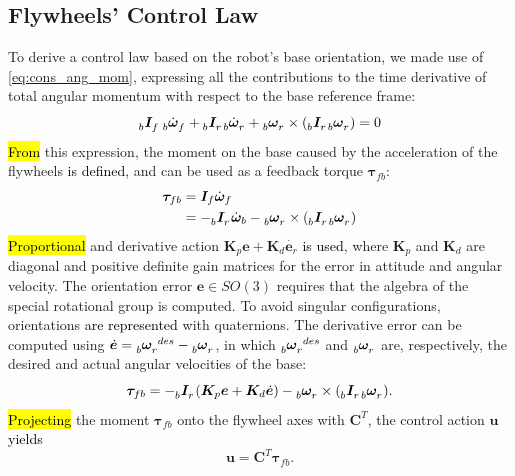 \documentclass[sensors,article,accept,pdftex,moreauthors]{Definitions/mdpi}
\newcommand{\MF}[1]{\textcolor{black}{#1}}
\begin{document}
\subsection{Flywheels' Control Law}
\label{subsec:control_law}
To derive a control law based on the robot's base orientation, we made use of \eqref{eq:cons_ang_mom}, expressing all the contributions to the time derivative of total angular momentum with respect to the base reference frame:
\begin{equation}
\tensor[_b]{\bm{I}}{_f} \, \tensor[_b]{\dot{\bm{\omega}}}{_f} + \tensor[_b]{\bm{I}}{_r} \tensor[_b]{\dot{\bm{\omega}}}{_r} + \tensor[_b]{\bm{\omega}}{_r} \times \left( \tensor[_b]{\bm{I}}{_r} \tensor[_b]{\bm{\omega}}{_r}\right) = 0
\end{equation}
\hl{From} this expression, the moment on the base caused by the acceleration of the flywheels \MF{is defined}, and can be used as a feedback torque $\bm{\tau}_{fb}$:
\begin{equation}
\begin{split}
\bm{\tau}_{fb} &= \bm{I}_f \dot{\bm{\omega}}_f \\
&= - \tensor[_b]{\bm{I}}{_r} \dot{\bm{\omega}}_b - \tensor[_b]{\bm{\omega}}{_r} \times \left( \tensor[_b]{\bm{I}}{_r} \tensor[_b]{\bm{\omega}}{_r}\right)
\end{split}
\end{equation}
\hl{Proportional} and derivative action $\bm{K}_p \bm{e} + \bm{K}_d \dot{\bm{e}_r}$ \MF{is used}, where $\bm{K}_p$ and $\bm{K}_d$ are diagonal and positive definite gain matrices for the error in attitude and angular velocity.
The orientation error $\bm{e} \in SO(3)$ requires that the algebra of the special rotational group is computed. To avoid singular configurations, orientations \MF{are represented} with quaternions.
The derivative error can be computed using $\dot{\bm{e}} = \tensor[_b]{\bm{\omega}}{_r^{des}} - \tensor[_b]{\bm{\omega}}{_r}$, in which $\tensor[_b]{\bm{\omega}}{_r^{des}}$ and $\tensor[_b]{\bm{\omega}}{_r}$ are, respectively, the desired and actual angular velocities of the base:
\begin{equation}
\bm{\tau}_{fb} = - \tensor[_b]{\bm{I}}{_r} \left(\bm{K}_p \bm{e} + \bm{K}_d \dot{\bm{e}}\right) - \tensor[_b]{\bm{\omega}}{_r} \times \left( \tensor[_b]{\bm{I}}{_r} \tensor[_b]{\bm{\omega}}{_r}\right).
\end{equation}
\hl{Projecting} the moment $\bm{\tau}_{fb}$ onto the flywheel axes with $\bm{C}^T$, the control action $\bm{u}$ \MF{yields}
\begin{equation}
\label{eq:ctrl_law}
\bm{u} = \bm{C}^T \bm{\tau}_{fb}.
\end{equation}
\end{document}
